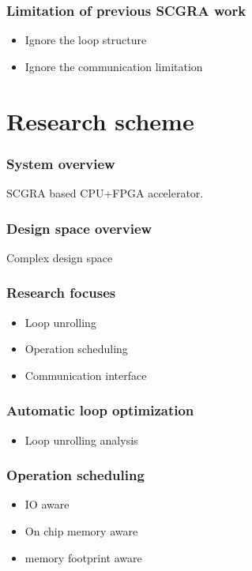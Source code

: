 \documentclass{beamer}
\begin{document}
\begin{frame}

\frametitle{Limitation of previous SCGRA work}
\begin{itemize}
\item Ignore the loop structure
\item Ignore the communication limitation
\end{itemize}

\end{frame}

\section{Research scheme}
\begin{frame}

\frametitle{System overview}
SCGRA based CPU+FPGA accelerator.

\end{frame}

\begin{frame}
\frametitle{Design space overview}
Complex design space

\end{frame}

\begin{frame}

\frametitle{Research focuses}
\begin{itemize}
\item Loop unrolling
\item Operation scheduling
\item Communication interface
\end{itemize}

\end{frame}

\begin{frame}

\frametitle{Automatic loop optimization}
\begin{itemize}
\item Loop unrolling analysis
\end{itemize}

\end{frame}

\begin{frame}

\frametitle{Operation scheduling}
\begin{itemize}
\item IO aware
\item On chip memory aware
\item memory footprint aware
\end{itemize}

\end{frame}
\end{document}
